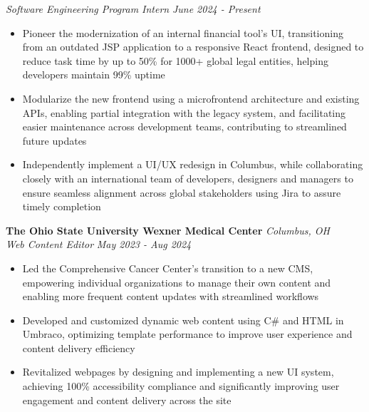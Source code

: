 \documentclass[letterpaper]{article}
\begin{document}
    \textit{Software Engineering Program Intern} \hfill \textsl{June 2024 - Present}\\
    \vspace{-7pt}
    \begin{itemize} \itemsep -1mm

            \item Pioneer the modernization of an internal financial tool’s UI, transitioning from an outdated JSP application to a responsive React frontend, designed to reduce task time by up to 50\% for 1000+ global legal entities, helping developers maintain 99\% uptime

            \item Modularize the new frontend using a microfrontend architecture and existing APIs, enabling partial integration with the legacy system, and facilitating easier maintenance across development teams, contributing to streamlined future updates
            
            \item Independently implement a UI/UX redesign in Columbus, while collaborating closely with an international team of developers, designers and managers to ensure seamless alignment across global stakeholders using Jira to assure timely completion
        
    \end{itemize}
    \vspace{-2mm}

    \textbf{The Ohio State University Wexner Medical Center} \hfill \textsl{Columbus, OH}\\
    
    \textit{Web Content Editor} \hfill \textsl{May 2023 - Aug 2024}\\
    \vspace{-7pt}
    \begin{itemize} \itemsep -1mm
        
            \item Led the Comprehensive Cancer Center’s transition to a new CMS, empowering individual organizations to manage their own content and enabling more frequent content updates with streamlined workflows

            \item Developed and customized dynamic web content using C\# and HTML in Umbraco, optimizing template performance to improve user experience and content delivery efficiency
            
            \item Revitalized webpages by designing and implementing a new UI system, achieving 100\% accessibility compliance and significantly improving user engagement and content delivery across the site

    \end{itemize}
    \vspace{-2mm}
\end{document}
